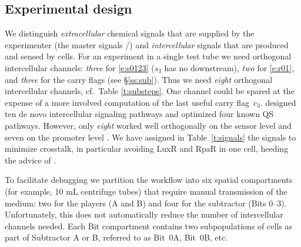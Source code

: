 \documentclass[12pt,notitlepage]{article}
\let\cite\citep
\newcommand{\ra}[1]{{\color{Blue}#1}}
\begin{document}












\subsection{Experimental design} \label{ss:experiment}

We distinguish
\emph{extracellular} chemical signals 
that are supplied by the experimenter
(the master signals /)
and
\emph{intercellular} signals
that are produced and sensed by cells.
%
%
%
For an experiment in a single test tube 
we need
orthogonal intercellular channels:
\emph{three} for \eqref{e:s0123}
($s_3$ has no downstream),
\emph{two} for \eqref{e:r01},
and
\emph{three} for the carry flags
(see \S\ref{ss:sub}).
%
Thus we need \emph{eight} orthogonal intercellular channels,
cf.~Table \ref{t:substeps}.
%
One channel could be spared 
at the expense
of a more involved computation of 
the last useful carry flag~$c_3$.
%
\citet{DuETAL2020}
designed
ten de novo intercellular signaling pathways
and
optimized
four known QS pathways.
%
However,
only \emph{eight} worked well orthogonally
on the sensor level 
and 
seven on the promoter level
\cite[\href{https://www.nature.com/articles/s41467-020-17993-w/figures/3}{Fig.~3c/g}]{DuETAL2020}.
%
We have assigned in Table~\ref{t:signals}
the signals
to minimize crosstalk,
in particular 
avoiding LuxR and RpaR in one cell,
heeding the advice of \citet[p.6]{DuETAL2020}.
%
%




%

\ra{
To facilitate debugging
we partition the workflow
into six 
spatial compartments
(for example, {10 mL centrifuge tubes})
that require manual transmission of 
the medium:
two for the players (A and B)
and
four for the subtractor (Bits 0--3).
%
%
Unfortunately, this does not automatically reduce
the number of intercellular channels needed.
%
Each Bit compartment
contains two subpopulations of cells 
as part of Subtractor A or B,
referred to as Bit~0A, Bit~0B, etc.
}

%
\end{document}
